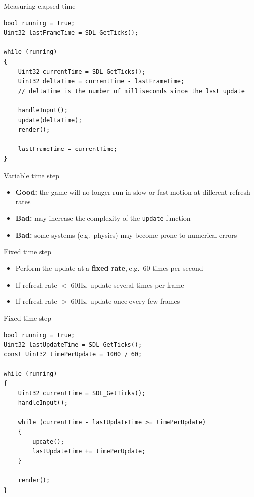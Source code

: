 \begin{frame}[fragile]{Measuring elapsed time}
    \begin{lstlisting}
bool running = true;
Uint32 lastFrameTime = SDL_GetTicks();

while (running)
{
    Uint32 currentTime = SDL_GetTicks();
    Uint32 deltaTime = currentTime - lastFrameTime;
    // deltaTime is the number of milliseconds since the last update
    
    handleInput();
    update(deltaTime);
    render();
    
    lastFrameTime = currentTime;
}
    \end{lstlisting}
\end{frame}

\begin{frame}{Variable time step}
    \begin{itemize}
        \item \textbf{Good:} the game will no longer run in slow or fast motion
            at different refresh rates \pause
        \item \textbf{Bad:} may increase the complexity of the \lstinline{update} function \pause
        \item \textbf{Bad:} some systems (e.g.\ physics) may become prone to numerical errors \pause
    \end{itemize}
\end{frame}

\begin{frame}{Fixed time step}
    \begin{itemize}
        \item Perform the update at a \textbf{fixed rate}, e.g.\ 60 times per second \pause
        \item If refresh rate $<$ 60Hz, update several times per frame \pause
        \item If refresh rate $>$ 60Hz, update once every few frames
    \end{itemize}
\end{frame}

\begin{frame}[fragile]{Fixed time step}
    \begin{lstlisting}
bool running = true;
Uint32 lastUpdateTime = SDL_GetTicks();
const Uint32 timePerUpdate = 1000 / 60;

while (running)
{
    Uint32 currentTime = SDL_GetTicks();
    handleInput();
    
    while (currentTime - lastUpdateTime >= timePerUpdate)
    {
        update();
        lastUpdateTime += timePerUpdate;
    }
    
    render();
}
    \end{lstlisting}
\end{frame}


